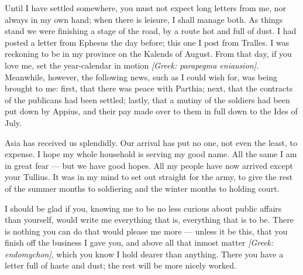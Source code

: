 

 Until I have settled somewhere, you must not expect long letters from me, nor always in my own hand; when there is leisure, I shall manage both. As things stand we were finishing a stage of the road, by a route hot and full of dust. I had posted a letter from Ephesus the day before; this one I post from Tralles. I was reckoning to be in my province on the Kalends of August. From that day, if you love me, set the year-calendar in motion \textit{[Greek: parapegma eniausion]}. Meanwhile, however, the following news, such as I could wish for, was being brought to me: first, that there was peace with Parthia; next, that the contracts of the publicans had been settled; lastly, that a mutiny of the soldiers had been put down by Appius, and their pay made over to them in full down to the Ides of July.

 Asia has received us splendidly. Our arrival has put no one, not even the least, to expense. I hope my whole household is serving my good name. All the same I am in great fear --- but we have good hopes. All my people have now arrived except your Tullius. It was in my mind to set out straight for the army, to give the rest of the summer months to soldiering and the winter months to holding court.

 I should be glad if you, knowing me to be no less curious about public affairs than yourself, would write me everything that is, everything that is to be. There is nothing you can do that would please me more --- unless it be this, that you finish off the business I gave you, and above all that inmost matter \textit{[Greek: endomychon]}, which you know I hold dearer than anything. There you have a letter full of haste and dust; the rest will be more nicely worked.
